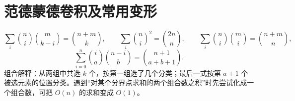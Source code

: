\section{范德蒙德卷积及常用变形}\label{knowledge-vandermonde}
\[
\sum_{i}\binom ni\binom m{k-i}=\binom{n+m}k,\qquad \sum_i\binom ni^2=\binom{2n}n,\qquad \sum_i\binom ni\binom mi=\binom{n+m}n,
\]
\[
\sum_{i=0}^{n}\binom ia\binom{n-i}b=\binom{n+1}{a+b+1}.
\]
组合解释：从两组中共选 $k$ 个，按第一组选了几个分类；最后一式按第 $a+1$ 个被选元素的位置分类。遇到“对某个分界点求和的两个组合数之积”时先尝试化成一个组合数，可把 $O(n)$ 的求和变成 $O(1)$。
